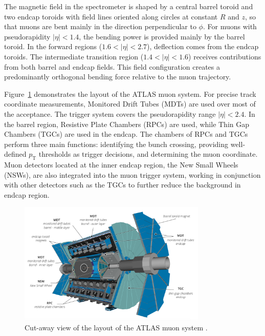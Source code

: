The magnetic field in the spectrometer is shaped by a central barrel toroid and two endcap toroids with field lines oriented along circles at constant \(R\) and \(z\), so that muons are bent mainly in the direction perpendicular to $\phi$. For muons with pseudorapidity $|\eta| < 1.4$, the bending power is provided mainly by the barrel toroid. In the forward regions ($1.6 < |\eta| < 2.7$), deflection comes from the endcap toroids. The intermediate transition region ($1.4 < |\eta| < 1.6$) receives contributions from both barrel and endcap fields. This field configuration creates a predominantly orthogonal bending force relative to the muon trajectory. 

Figure~\ref{fig:muon_system} demonstrates the layout of the ATLAS muon system. For precise track coordinate measurements, Monitored Drift Tubes ({MDT}s) are used over most of the acceptance. The trigger system covers the pseudorapidity range $|\eta| < 2.4$. In the barrel region, Resistive Plate Chambers ({RPC}s) are used, while Thin Gap Chambers ({TGC}s) are used in the endcap. The chambers of RPCs and TGCs perform three main functions: identifying the bunch crossing, providing well-defined $p_\mathrm{T}$ thresholds as trigger decisions, and determining the muon coordinate. Muon detectors located at the inner endcap region, the New Small Wheels ({NSW}s), are also integrated into the muon trigger system, working in conjunction with other detectors such as the TGCs to further reduce the background in endcap region.

\begin{figure}[htbp]
  \centering
  \includegraphics[width=0.8\textwidth]{figs/chapter2/muon_system.png}
  \caption{Cut-away view of the layout of the ATLAS muon system \cite{ATLASRun3Detector}.}
  \label{fig:muon_system}
\end{figure}

